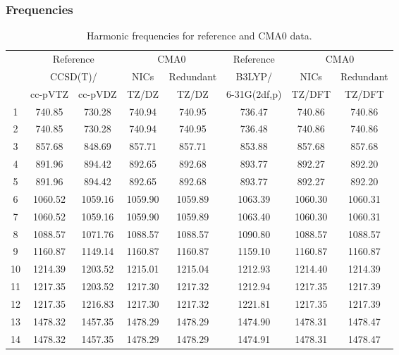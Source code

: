 \documentclass[10pt,oneside]{article}
\begin{document}
\begin{table}[h!]
\subsubsection*{Frequencies}
\centering
\caption{Harmonic frequencies for reference and CMA0 data.}
\begin{tabular}{cccccccc}
\toprule
{} & \multicolumn{2}{c}{Reference} & \multicolumn{2}{c}{CMA0} &    Reference & \multicolumn{2}{c}{CMA0} \\
{} & \multicolumn{2}{c}{CCSD(T)/} &    NICs &  Redundant &       B3LYP/ &    NICs & Redundant \\
{} &   cc-pVTZ & cc-pVDZ &   TZ/DZ &      TZ/DZ & 6-31G(2df,p) &  TZ/DFT &    TZ/DFT \\
\midrule
1  &    740.85 &  730.28 &  740.94 &     740.95 &       736.47 &  740.86 &    740.86 \\
2  &    740.85 &  730.28 &  740.94 &     740.95 &       736.48 &  740.86 &    740.86 \\
3  &    857.68 &  848.69 &  857.71 &     857.71 &       853.88 &  857.68 &    857.68 \\
4  &    891.96 &  894.42 &  892.65 &     892.68 &       893.77 &  892.27 &    892.20 \\
5  &    891.96 &  894.42 &  892.65 &     892.68 &       893.77 &  892.27 &    892.20 \\
6  &   1060.52 & 1059.16 & 1059.90 &    1059.89 &      1063.39 & 1060.30 &   1060.31 \\
7  &   1060.52 & 1059.16 & 1059.90 &    1059.89 &      1063.40 & 1060.30 &   1060.31 \\
8  &   1088.57 & 1071.76 & 1088.57 &    1088.57 &      1090.80 & 1088.57 &   1088.57 \\
9  &   1160.87 & 1149.14 & 1160.87 &    1160.87 &      1159.10 & 1160.87 &   1160.87 \\
10 &   1214.39 & 1203.52 & 1215.01 &    1215.04 &      1212.93 & 1214.40 &   1214.39 \\
11 &   1217.35 & 1203.52 & 1217.30 &    1217.32 &      1212.94 & 1217.35 &   1217.39 \\
12 &   1217.35 & 1216.83 & 1217.30 &    1217.32 &      1221.81 & 1217.35 &   1217.39 \\
13 &   1478.32 & 1457.35 & 1478.29 &    1478.29 &      1474.90 & 1478.31 &   1478.47 \\
14 &   1478.32 & 1457.35 & 1478.29 &    1478.29 &      1474.91 & 1478.31 &   1478.47 \\

\end{tabular}
\end{table}
\end{document}
